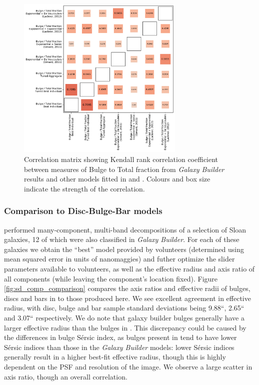 \documentclass[../main.tex]{subfiles}
\begin{document}
\begin{figure}
  \includegraphics[width=8cm]{images__results/b-t_comparison_correlation.pdf}
  \caption{Correlation matrix showing Kendall rank correlation coefficient between measures of Bulge to Total fraction from \textit{Galaxy Builder} results and other models fitted in \citet{Simard2011:1107.1518v1} and \citet{2012MNRAS.421.2277L}. Colours and box size indicate the strength of the correlation.}
  \label{fig:bt_correlation}
\end{figure}


\subsubsection{Comparison to Disc-Bulge-Bar models}

\citet{Kruk2017:1710.00093v2} performed many-component, multi-band decompositions of a selection of Sloan galaxies, 12 of which were also classified in \textit{Galaxy Builder}. For each of these galaxies we obtain the ``best'' model provided by volunteers (determined using mean squared error in units of nanomaggies) and futher optimize the slider parameters available to volunteers, as well as the effective radius and axis ratio of all components (while leaving the component's location fixed). Figure \ref{fig:sd_comp_comparison} compares the axis ratios and effective radii of bulges, discs and bars in \citet{Kruk2017:1710.00093v2} to those produced here. We see excellent agreement in effective radius, with disc, bulge and bar sample standard deviations being 9.88``, 2.65`` and 3.07`` respectively. We do note that galaxy builder bulges generally have a larger effective radius than the bulges in \citet{Kruk2017:1710.00093v2}. This discrepancy could be caused by the differences in bulge S\'ersic index, as bulges present in \citet{Kruk2017:1710.00093v2} tend to have lower S\'ersic indices than those in the \textit{Galaxy Builder} models: lower Sérsic indices generally result in a higher best-fit effective radius, though this is highly dependent on the PSF and resolution of the image. We observe a large scatter in axis ratio, though an overall correlation.
\end{document}
